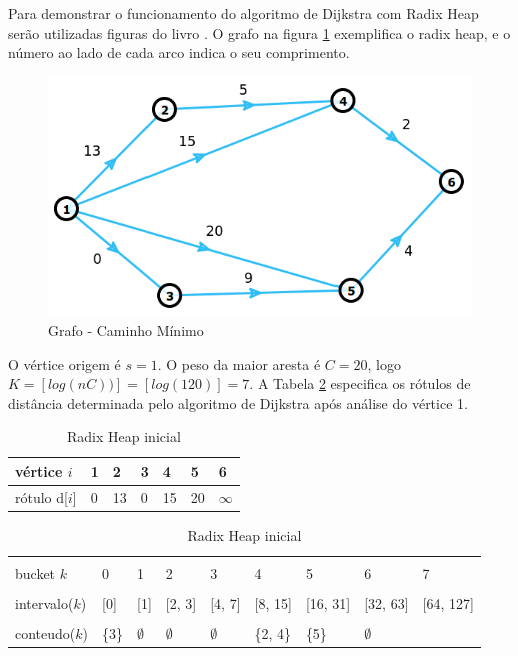 Para demonstrar o funcionamento do algoritmo de Dijkstra com Radix Heap serão utilizadas figuras do livro \cite{bookahuja}.
O grafo na figura \ref{fig:grafoRadix} exemplifica o radix heap, e o número ao lado de cada arco indica o seu comprimento.
\FloatBarrier
\begin{figure}[htbp]
\centering
 \includegraphics[width=.65\textwidth]{chapters/fig/grafoRadix.png}
\caption{Grafo - Caminho Mínimo}
\label{fig:grafoRadix}
\end{figure}
\FloatBarrier
O vértice origem é $s = 1$. O peso da maior aresta é $C = 20$, logo $K = [log(nC))] = [log(120)] = 7$.
A Tabela \ref{tab:initialradixheap} especifica os rótulos de distância determinada pelo algoritmo de Dijkstra
após análise do vértice 1.
\FloatBarrier
\begin{table}[htbp]
	\centering
	\begin{tabular}{l l l l l l l}
	\toprule
	vértice $i$ & 1 & 2 & 3 & 4 & 5 & 6\\
	\midrule
	rótulo d[$i$] & 0 & 13 & 0 & 15 & 20 & $\infty$ \\
	\bottomrule
	\end{tabular}
	
	\centering
	\begin{tabular}{l l l l l l l l l}
	\toprule
	\\bucket $k$ & 0 & 1 & 2 & 3 & 4 & 5 & 6 & 7\\
	\midrule
	\\intervalo($k$) & [0] & [1] & [2, 3] & [4, 7] & [8, 15] & [16, 31] & [32, 63] & [64, 127]\\
	\\conteudo($k$) & \{3\} & $\emptyset$ & $\emptyset$ & $\emptyset$ & \{2, 4\} & \{5\} & $\emptyset$ & \\
	\bottomrule
	\end{tabular}
\caption{Radix Heap inicial}
 \label{tab:initialradixheap}
\end{table}

